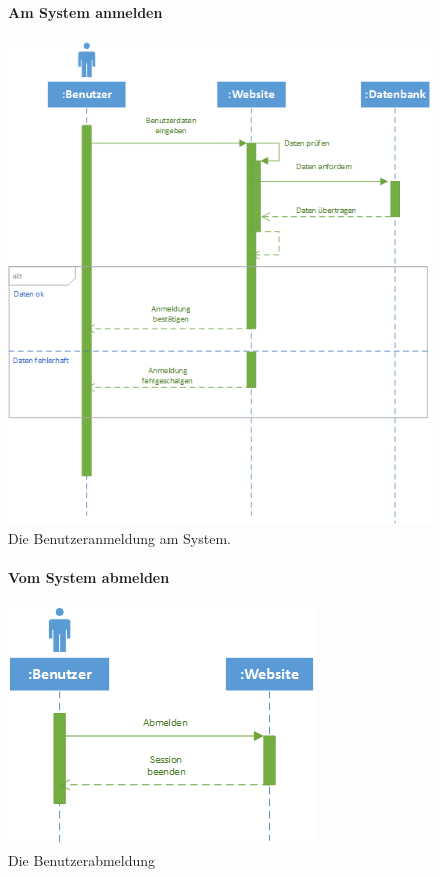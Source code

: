 \documentclass[12pt,a4paper]{article}
\begin{document}
\begin{figure}[H]
	\centering
	\paragraph{Am System anmelden}
	\includegraphics[width=\textwidth]{Bilder/Sequenzdiagramme/AmSystemAnmelden.png}
	\caption{Die Benutzeranmeldung am System.}
	\label{SzAmSystemAnmelden}
\end{figure}
\begin{figure}[H]
	\centering
	\paragraph{Vom System abmelden}
	\includegraphics[width=\textwidth]{Bilder/Sequenzdiagramme/VomSystemAbmelden.png}
	\caption{Die Benutzerabmeldung}
	\label{SzVomSystemAbmelden}
\end{figure}
\end{document}
